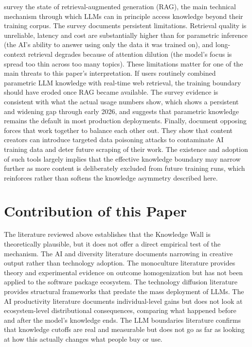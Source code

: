 \documentclass[12pt, a4paper]{report}
\begin{document}
\citet{gao2024retrieval} survey the state of retrieval-augmented generation (RAG), the main technical mechanism through which LLMs can in principle access knowledge beyond their training corpus. The survey documents persistent limitations. Retrieval quality is unreliable, latency and cost are substantially higher than for parametric inference (the AI's ability to answer using only the data it was trained on), and long-context retrieval degrades because of attention dilution (the model’s focus is spread too thin across too many topics). These limitations matter for one of the main threats to this paper's interpretation. If users routinely combined parametric LLM knowledge with real-time web retrieval, the training boundary should have eroded once RAG became available. The survey evidence is consistent with what the actual usage numbers show, which shows a persistent and widening gap through early 2026, and suggests that parametric knowledge remains the default in most production deployments. Finally, \citet{shan2024nightshade} document opposing forces that work together to balance each other out. They show that content creators can introduce targeted data poisoning attacks to contaminate AI training data and deter future scraping of their work. The existence and adoption of such tools largely implies that the effective knowledge boundary may narrow further as more content is deliberately excluded from future training runs, which reinforces rather than softens the knowledge asymmetry described here.

\section{Contribution of this Paper}\label{sec:lit-contribution}

The literature reviewed above establishes that the Knowledge Wall is theoretically plausible, but it does not offer a direct empirical test of the mechanism. The AI and diversity literature documents narrowing in creative output rather than technology adoption. The monoculture literature provides theory and experimental evidence on outcome homogenization but has not been applied to the software package ecosystem. The technology diffusion literature provides structural frameworks that predate the mass deployment of LLMs. The AI productivity literature documents individual-level gains but does not look at ecosystem-level distributional consequences, comparing what happened before and after the model's knowledge ends. The LLM boundaries literature confirms that knowledge cutoffs are real and measurable but does not go as far as looking at how this actually changes what people buy or use.
\end{document}
